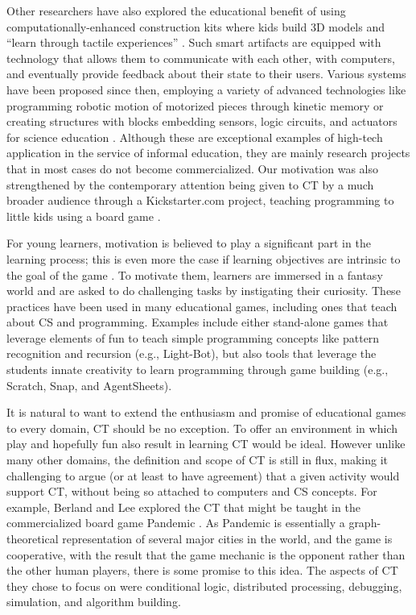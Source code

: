 \documentclass{acm_proc_article-sp}
\begin{document}
Other researchers have also explored the educational benefit of using computationally-enhanced construction kits where kids build 3D models and ``learn through tactile experiences'' \cite{eisenberg2002computationally}.
Such smart artifacts are equipped with technology that allows them to communicate with each other, with computers, and eventually provide feedback about their state to their users.
Various systems have been proposed since then, employing a variety of advanced technologies like programming robotic motion of motorized pieces through kinetic memory \cite{raffle2004topobo} or creating structures with blocks embedding sensors, logic circuits, and actuators for science education \cite{schweikardt2006roblocks}.
Although these are exceptional examples of high-tech application in the service of informal education, they are mainly research projects that in most cases do not become commercialized.
Our motivation was also strengthened by the contemporary attention being given to CT by a much broader audience through a Kickstarter.com project, teaching programming to little kids using a board game \cite{robotturtles}.

For young learners, motivation is believed to play a significant part in the learning process; this is even more the case if learning objectives are intrinsic to the goal of the game \cite{malone1987making}.
To motivate them, learners are immersed in a fantasy world and are asked to do challenging tasks by instigating their curiosity.
These practices have been used in many educational games, including ones that teach about CS and programming.
Examples include either stand-alone games that leverage elements of fun to teach simple programming concepts like pattern recognition and recursion (e.g., Light-Bot), but also tools that leverage the students innate creativity to learn programming through game building (e.g., Scratch, Snap, and AgentSheets).

It is natural to want to extend the enthusiasm and promise of educational games to every domain, CT should be no exception.
To offer an environment in which play and hopefully fun also result in learning CT would be ideal.
However unlike many other domains, the definition and scope of CT is still in flux, making it challenging to argue (or at least to have agreement) that a given activity would support CT, without being so attached to computers and CS concepts.
For example, Berland and Lee explored the CT that might be taught in the commercialized board game Pandemic \cite{berland2011collaborative}.
As Pandemic is essentially a graph-theoretical representation of several major cities in the world, and the game is cooperative, with the result that the game mechanic is the opponent rather than the other human players, there is some promise to this idea.
The aspects of CT they chose to focus on were conditional logic, distributed processing, debugging, simulation, and algorithm building. 
\end{document}
